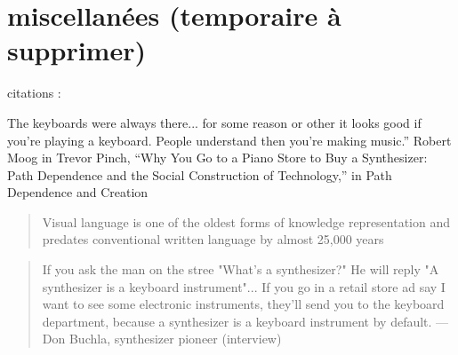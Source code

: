 \section*{miscellanées (temporaire à supprimer)}
citations :

The  keyboards  were  always  there...  for  some  reason  or  other  it  looks  good  if  you’re playing a keyboard. People understand then you’re making music.” Robert Moog in Trevor Pinch, “Why You Go to a Piano Store to Buy a Synthesizer: Path Dependence and the Social Construction of Technology,” in Path Dependence and Creation



\begin{quote}
Visual language is one of the oldest forms of knowledge representation and predates conventional written language by almost 25,000 years
\end{quote}
\cite{tufte_visual_2001}

\cite{moody_physics_2009}


\begin{quotation}
If you ask the man on the stree "What's a synthesizer?" He will reply "A synthesizer is a keyboard instrument"... If you go in a retail store ad say I want to see some electronic instruments, they'll send you to the keyboard department, because a synthesizer is a keyboard instrument by default. — Don Buchla, synthesizer pioneer (interview)
\end{quotation}
\cite{pinch_why_2001}